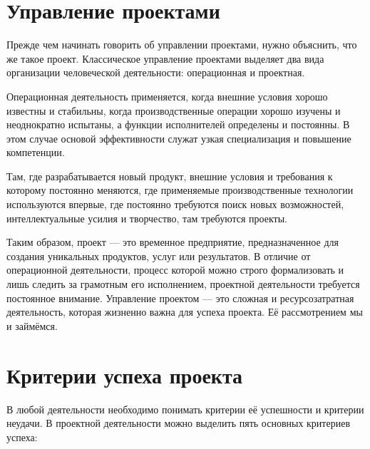 \documentclass{../../text-style}
\begin{document}
\maketitle
\thispagestyle{empty}


\section{Управление проектами}

Прежде чем начинать говорить об управлении проектами, нужно объяснить, что же такое проект. Классическое управление проектами выделяет два вида организации человеческой деятельности: операционная и проектная.

Операционная деятельность применяется, когда внешние условия хорошо известны и стабильны, когда производственные операции хорошо изучены и неоднократно испытаны, а функции исполнителей определены и постоянны. В этом случае основой эффективности служат узкая специализация и повышение компетенции.

Там, где разрабатывается новый продукт, внешние условия и требования к которому постоянно меняются, где применяемые производственные технологии используются впервые, где постоянно требуются поиск новых возможностей, интеллектуальные усилия и творчество, там требуются проекты.

Таким образом, проект --- это временное предприятие, предназначенное для создания уникальных продуктов, услуг или результатов. В отличие от операционной деятельности, процесс которой можно строго формализовать и лишь следить за грамотным его исполнением, проектной деятельности требуется постоянное внимание. Управление проектом --- это сложная и ресурсозатратная деятельность, которая жизненно важна для успеха проекта. Её рассмотрением мы и займёмся.

\section{Критерии успеха проекта}

В любой деятельности необходимо понимать критерии её успешности и критерии неудачи. В проектной деятельности можно выделить пять основных критериев успеха:
\end{document}
